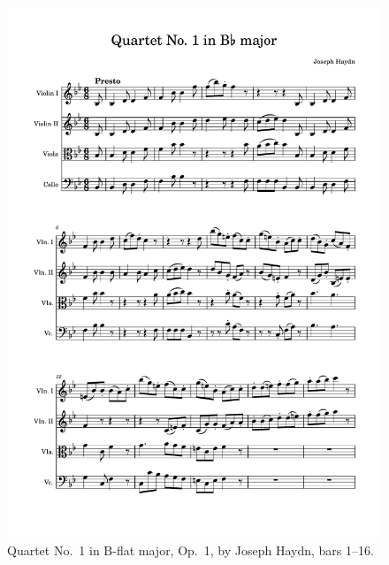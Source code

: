 \documentclass[12pt]{article}
\theoremstyle{definition}
\begin{document}
\begin{figure}
    \includegraphics[width=\textwidth,page=1]{haydn-score.pdf}
    \caption{Quartet No.\ 1 in B-flat major, Op.\ 1, by Joseph Haydn, bars 1--16.}
\end{figure}
\end{document}
